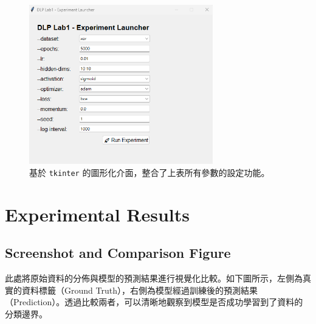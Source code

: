 \documentclass{article}
\begin{document}
\begin{figure}[h!]
    \centering
    \includegraphics[width=8cm]{Lab01_report/img/2.4-1.png}
    \caption{基於 \texttt{tkinter} 的圖形化介面，整合了上表所有參數的設定功能。}
    \label{fig:gui}
\end{figure}



\clearpage  %

\section{Experimental Results}


\subsection{Screenshot and Comparison Figure}
此處將原始資料的分佈與模型的預測結果進行視覺化比較。如下圖所示，左側為真實的資料標籤（Ground Truth），右側為模型經過訓練後的預測結果（Prediction）。透過比較兩者，可以清晰地觀察到模型是否成功學習到了資料的分類邊界。
\end{document}
